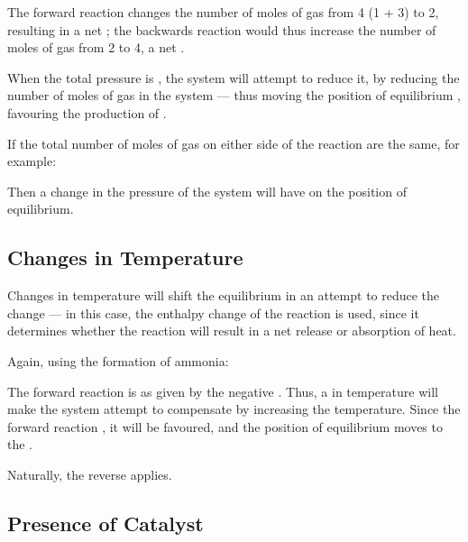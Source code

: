 			The forward reaction changes the number of moles of gas from \num{4} (\num{1} + \num{3}) to \num{2}, resulting in a net
			; the backwards reaction would thus increase the number of moles of gas from \num{2} to \num{4}, a net
			.

			When the total pressure is , the system will attempt to reduce it, by reducing the number of moles of gas
			in the system --- thus moving the position of equilibrium , favouring the production of .

			\pagebreak
			If the total number of moles of gas on either side of the reaction are the same, for example:


			Then a change in the pressure of the system will have  on the position of equilibrium.



		\subsection{Changes in Temperature}

			Changes in temperature will shift the equilibrium in an attempt to reduce the change --- in this case, the enthalpy change
			of the reaction is used, since it determines whether the reaction will result in a net release or absorption of heat.

			Again, using the formation of ammonia:


			The forward reaction is  as given by the negative \enth{}. Thus, a  in temperature will
			make the system attempt to compensate by increasing the temperature. Since the forward reaction , it will
			be favoured, and the position of equilibrium moves to the .

			Naturally, the reverse applies.



		\subsection{Presence of Catalyst}

